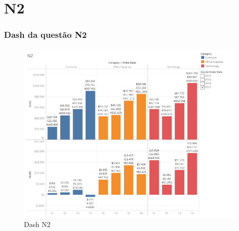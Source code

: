 \chapter{N2}

\subsection*{Dash da questão N2}
\begin{figure}[h]
	\centering
	\includegraphics[width=\textwidth,keepaspectratio]{figures/n2_dash}
	\caption{Dash N2}
	\label{lof}
\end{figure}